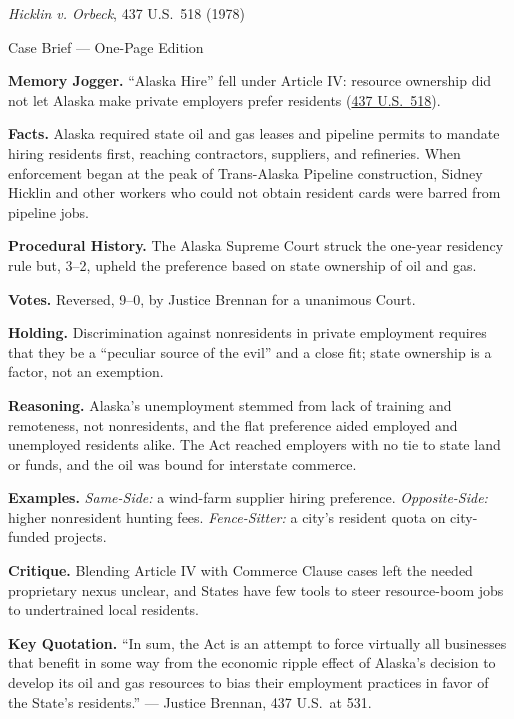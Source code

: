 \documentclass[12pt]{article}
\begin{document}
\begin{center}
{\Large \textit{Hicklin v. Orbeck}, 437 U.S.\ 518 (1978)\par}
\vspace{0.3em}
{\normalsize Case Brief --- One-Page Edition\par}
\end{center}

\textbf{Memory Jogger.} ``Alaska Hire'' fell under Article IV: resource ownership did not let Alaska make private employers prefer residents (\href{https://supreme.justia.com/cases/federal/us/437/518/}{437 U.S.\ 518}).

\textbf{Facts.} Alaska required state oil and gas leases and pipeline permits to mandate hiring residents first, reaching contractors, suppliers, and refineries. When enforcement began at the peak of Trans-Alaska Pipeline construction, Sidney Hicklin and other workers who could not obtain resident cards were barred from pipeline jobs.

\textbf{Procedural History.} The Alaska Supreme Court struck the one-year residency rule but, 3--2, upheld the preference based on state ownership of oil and gas.

\textbf{Votes.} Reversed, 9--0, by Justice Brennan for a unanimous Court.

\textbf{Holding.} Discrimination against nonresidents in private employment requires that they be a ``peculiar source of the evil'' and a close fit; state ownership is a factor, not an exemption.

\textbf{Reasoning.} Alaska's unemployment stemmed from lack of training and remoteness, not nonresidents, and the flat preference aided employed and unemployed residents alike. The Act reached employers with no tie to state land or funds, and the oil was bound for interstate commerce.

\textbf{Examples.} \emph{Same-Side:} a wind-farm supplier hiring preference. \emph{Opposite-Side:} higher nonresident hunting fees. \emph{Fence-Sitter:} a city's resident quota on city-funded projects.

\textbf{Critique.} Blending Article IV with Commerce Clause cases left the needed proprietary nexus unclear, and States have few tools to steer resource-boom jobs to undertrained local residents.

\textbf{Key Quotation.} ``In sum, the Act is an attempt to force virtually all businesses that benefit in some way from the economic ripple effect of Alaska's decision to develop its oil and gas resources to bias their employment practices in favor of the State's residents.'' --- Justice Brennan, 437 U.S.\ at 531.
\end{document}
